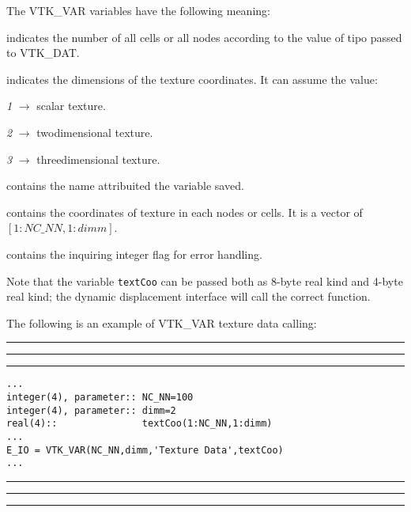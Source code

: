 \documentclass[pagesize=pdftex,fontsize=10pt,paper=a4,oneside]{scrbook}
\DeclareRobustCommand{\MarginNote}[1]{\marginpar{%
\slshape\footnotesize%
\parindent=0pt\lineskip=0pt\lineskiplimit=0pt%
\tolerance=2000\hyphenpenalty=300\exhyphenpenalty=300%
\doublehyphendemerits=100000\finalhyphendemerits=\doublehyphendemerits%
\raggedright\hspace{0pt}#1}}
\newenvironment{boxred}[1]%
               {%
                \noindent\hspace*{-0.025\textwidth}%
                \color{Maroon}%
                \rule[-5.8pt]{0.6pt}{6pt}\hspace*{-0.6pt}\rule{1.05\textwidth}{0.6pt}\hspace*{-0.6pt}\rule[-5.8pt]{0.6pt}{6pt}%
                \color{black}%
                \vspace*{0.6pt}\MarginNote{\color{Maroon}{#1}}%
               }%
               {%
                \noindent\hspace*{-0.025\textwidth}%
                \color{Maroon}%
                \rule[0pt]{0.6pt}{6pt}\hspace*{-0.6pt}\rule{1.05\textwidth}{0.6pt}\hspace*{-0.6pt}\rule[0pt]{0.6pt}{6pt}%
                \color{black}%
                \vspace*{2mm}%
               }
\newenvironment{enumerateABlu}%
{\def\theenumi{\textsc{\EnumFont\color{RoyalBlue}\Alph{enumi}}}%
\enumerate}%
{\endenumerate}
\begin{document}
The VTK\_VAR variables have the following meaning:

\begin{description}
 \item[{\color{RoyalBlue}NC\_NN}] indicates the number of all cells or all nodes according to the value of
                                  {\color{RoyalBlue}tipo} passed to VTK\_DAT.
 \item[{\color{RoyalBlue}dimm}] indicates the dimensions of the texture coordinates. It can assume the value:
 \begin{enumerateABlu}
  \item \emph{1} $\rightarrow$ scalar texture.
  \item \emph{2} $\rightarrow$ twodimensional texture.
  \item \emph{3} $\rightarrow$ threedimensional texture.
 \end{enumerateABlu}
 \item[{\color{RoyalBlue}varname}] contains the name attribuited the variable saved.
 \item[{\color{RoyalBlue}textCoo}] contains the coordinates of texture in each nodes or cells. It is a vector of
                                   $[1:NC\_NN,1:dimm]$.
 \item[{\color{RoyalBlue}E\_IO}] contains the inquiring integer flag for error handling.
\end{description}

Note that the variable \texttt{textCoo} can be passed both as 8-byte real kind and 4-byte real kind; the dynamic
displacement interface will call the correct function.

The following is an example of VTK\_VAR texture data calling:

\begin{boxred}{VTK\_VAR Texture Data Calling}
\begin{verbatim}
...
integer(4), parameter:: NC_NN=100
integer(4), parameter:: dimm=2
real(4)::               textCoo(1:NC_NN,1:dimm)
...
E_IO = VTK_VAR(NC_NN,dimm,'Texture Data',textCoo)
...
\end{verbatim}
\end{boxred}
\end{document}
